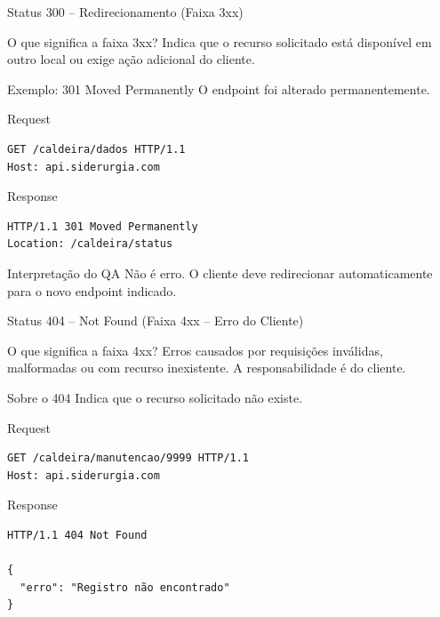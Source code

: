 \documentclass[9pt]{beamer}
\begin{document}
\begin{frame}[fragile]{Status 300 – Redirecionamento (Faixa 3xx)}

\begin{block}{O que significa a faixa 3xx?}
Indica que o recurso solicitado
está disponível em outro local
ou exige ação adicional do cliente.
\end{block}

\begin{block}{Exemplo: 301 Moved Permanently}
O endpoint foi alterado permanentemente.
\end{block}

\begin{block}{Request}
\begin{verbatim}
GET /caldeira/dados HTTP/1.1
Host: api.siderurgia.com
\end{verbatim}
\end{block}

\begin{block}{Response}
\begin{verbatim}
HTTP/1.1 301 Moved Permanently
Location: /caldeira/status
\end{verbatim}
\end{block}

\begin{block}{Interpretação do QA}
Não é erro.
O cliente deve redirecionar automaticamente
para o novo endpoint indicado.
\end{block}

\end{frame}

\begin{frame}[fragile]{Status 404 – Not Found (Faixa 4xx – Erro do Cliente)}

\begin{block}{O que significa a faixa 4xx?}
Erros causados por requisições inválidas,
malformadas ou com recurso inexistente.
A responsabilidade é do cliente.
\end{block}

\begin{block}{Sobre o 404}
Indica que o recurso solicitado não existe.
\end{block}

\begin{block}{Request}
\begin{verbatim}
GET /caldeira/manutencao/9999 HTTP/1.1
Host: api.siderurgia.com
\end{verbatim}
\end{block}

\begin{block}{Response}
\begin{verbatim}
HTTP/1.1 404 Not Found

{
  "erro": "Registro não encontrado"
}
\end{verbatim}
\end{block}


\end{frame}
\end{document}
